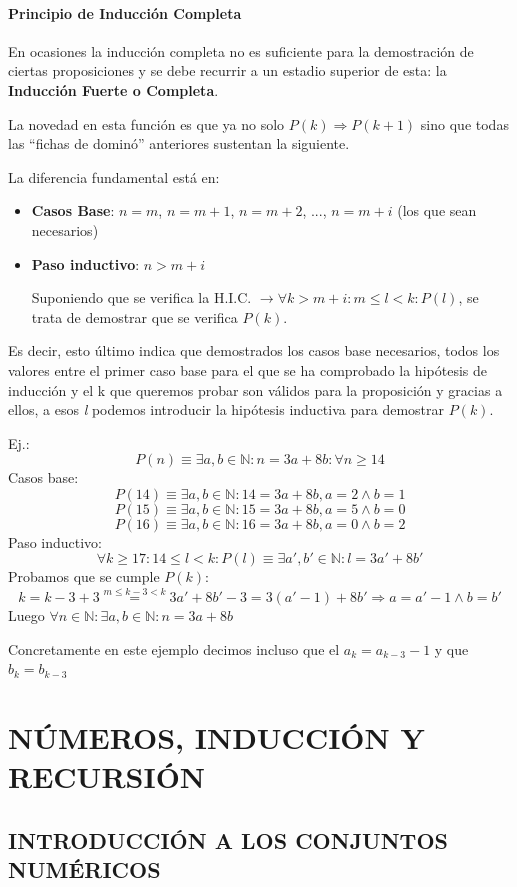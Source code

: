 \documentclass[10pt,a4paper,openright]{book}
\begin{document}
\subsubsection*{Principio de Inducción Completa}
En ocasiones la inducción completa no es suficiente para la demostración de ciertas proposiciones y se debe recurrir a un estadio superior de esta: la \textbf{Inducción Fuerte o Completa}.\par
La novedad en esta función es que ya no solo $P(k)\Rightarrow P(k+1)$ sino que todas las ``fichas de dominó'' anteriores sustentan la siguiente.\par
La diferencia fundamental está en:
\begin{itemize}
\item \textbf{Casos Base}: $n=m$, $n=m+1$, $n=m+2$, ..., $n=m+i$ (los que sean necesarios)
\item \textbf{Paso inductivo}: $n>m+i$\par
Suponiendo que se verifica la H.I.C. $\rightarrow \forall k>m+i : m\leq l < k : P(l)$, se trata de demostrar que se verifica $P(k)$.
\end{itemize}
Es decir, esto último indica que demostrados los casos base necesarios, todos los valores entre el primer caso base para el que se ha comprobado la hipótesis de inducción y el k que queremos probar son válidos para la proposición y gracias a ellos, a esos \textit{l} podemos introducir la hipótesis inductiva para demostrar $P(k)$.\par
Ej.:
$$P(n)\equiv \exists a,b \in \mathbb N: n=3a+8b : \forall n \geq 14$$
Casos base:
$$P(14)\equiv \exists a, b \in \mathbb N : 14=3a+8b, a=2 \wedge b=1$$
$$P(15)\equiv \exists a, b \in \mathbb N : 15=3a+8b, a=5 \wedge b=0$$
$$P(16)\equiv \exists a, b \in \mathbb N : 16=3a+8b, a=0 \wedge b=2$$
Paso inductivo:
$$\forall k \geq 17: 14\leq l<k:P(l)\equiv \exists a',b'\in \mathbb N : l=3a'+8b'$$
Probamos que se cumple $P(k)$:
$$k=k-3+3\stackrel{m \leq k-3<k}{=}3a'+8b'-3=3(a'-1)+8b'\Rightarrow a=a'-1 \wedge b=b'$$
Luego $\forall n\in \mathbb N: \exists a,b \in \mathbb N: n=3a+8b$\par
Concretamente en este ejemplo decimos incluso que el $a_k=a_{k-3}-1$ y que $b_k=b_{k-3}$

\chapter*{NÚMEROS, INDUCCIÓN Y RECURSIÓN}
\section*{INTRODUCCIÓN A LOS CONJUNTOS NUMÉRICOS}
\end{document}
